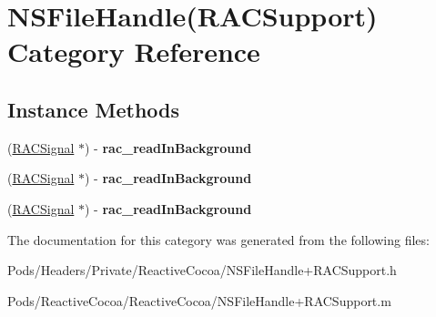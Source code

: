 \hypertarget{category_n_s_file_handle_07_r_a_c_support_08}{}\section{N\+S\+File\+Handle(R\+A\+C\+Support) Category Reference}
\label{category_n_s_file_handle_07_r_a_c_support_08}
\subsection*{Instance Methods}
\begin{DoxyCompactItemize}
\item 
\mbox{\label{category_n_s_file_handle_07_r_a_c_support_08_a41ae48eaeb1950362af0e55755102aef}} 
(\mbox{\hyperlink{interface_r_a_c_signal}{R\+A\+C\+Signal}} $\ast$) -\/ {\bfseries rac\+\_\+read\+In\+Background}
\item 
\mbox{\label{category_n_s_file_handle_07_r_a_c_support_08_a41ae48eaeb1950362af0e55755102aef}} 
(\mbox{\hyperlink{interface_r_a_c_signal}{R\+A\+C\+Signal}} $\ast$) -\/ {\bfseries rac\+\_\+read\+In\+Background}
\item 
\mbox{\label{category_n_s_file_handle_07_r_a_c_support_08_a41ae48eaeb1950362af0e55755102aef}} 
(\mbox{\hyperlink{interface_r_a_c_signal}{R\+A\+C\+Signal}} $\ast$) -\/ {\bfseries rac\+\_\+read\+In\+Background}
\end{DoxyCompactItemize}


The documentation for this category was generated from the following files\+:\begin{DoxyCompactItemize}
\item 
Pods/\+Headers/\+Private/\+Reactive\+Cocoa/N\+S\+File\+Handle+\+R\+A\+C\+Support.\+h\item 
Pods/\+Reactive\+Cocoa/\+Reactive\+Cocoa/N\+S\+File\+Handle+\+R\+A\+C\+Support.\+m\end{DoxyCompactItemize}
